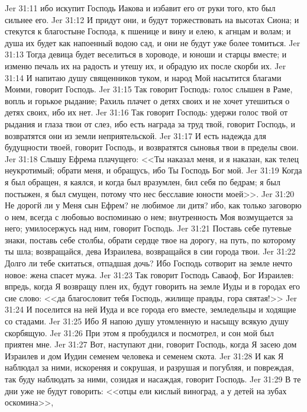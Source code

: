 \vs Jer 31:11 ибо искупит Господь Иакова и избавит его от руки того, кто был сильнее его.
\vs Jer 31:12 И придут они, и будут торжествовать на высотах Сиона; и стекутся к благостыне Господа, к пшенице и вину и елею, к агнцам и волам; и душа их будет как напоенный водою сад, и они не будут уже более томиться.
\vs Jer 31:13 Тогда девица будет веселиться в хороводе, и юноши и старцы вместе; и изменю печаль их на радость и утешу их, и обрадую их после скорби их.
\vs Jer 31:14 И напитаю душу священников туком, и народ Мой насытится благами Моими, говорит Господь.
\rsbpar\vs Jer 31:15 Так говорит Господь: голос слышен в Раме, вопль и горькое рыдание; Рахиль плачет о детях своих и не хочет утешиться о детях своих, ибо их нет.
\vs Jer 31:16 Так говорит Господь: удержи голос твой от рыдания и глаза твои от слез, ибо есть награда за труд твой, говорит Господь, и возвратятся они из земли неприятельской.
\vs Jer 31:17 И есть надежда для будущности твоей, говорит Господь, и возвратятся сыновья твои в пределы свои.
\vs Jer 31:18 Слышу Ефрема плачущего: <<Ты наказал меня, и я наказан, как телец неукротимый; обрати меня, и обращусь, ибо Ты Господь Бог мой.
\vs Jer 31:19 Когда я был обращен, я каялся, и когда был вразумлен, бил себя по бедрам; я был постыжен, я был смущен, потому что нес бесславие юности моей>>.
\vs Jer 31:20 Не дорогй ли у Меня сын Ефрем? не любимое ли дитя? ибо, как только заговорю о нем, всегда с любовью воспоминаю о нем; внутренность Моя возмущается за него; умилосержусь над ним, говорит Господь.
\vs Jer 31:21 Поставь себе путевые знаки, поставь себе столбы, обрати сердце твое на дорогу, на путь, по которому ты шла; возвращайся, дева Израилева, возвращайся в сии города твои.
\vs Jer 31:22 Долго ли тебе скитаться, отпадшая дочь? Ибо Господь сотворит на земле нечто новое: жена спасет мужа.
\rsbpar\vs Jer 31:23 Так говорит Господь Саваоф, Бог Израилев: впредь, когда Я возвращу плен их, будут говорить на земле Иуды и в городах его сие слово: <<да благословит тебя Господь, жилище правды, гора святая!>>
\vs Jer 31:24 И поселится на ней Иуда и все города его вместе, земледельцы и ходящие со стадами.
\vs Jer 31:25 Ибо Я напою душу утомленную и насыщу всякую душу скорбящую.
\vs Jer 31:26 При этом я пробудился и посмотрел, и сон мой был приятен мне.
\vs Jer 31:27 Вот, наступают дни, говорит Господь, когда Я засею дом Израилев и дом Иудин семенем человека и семенем скота.
\vs Jer 31:28 И как Я наблюдал за ними, искореняя и сокрушая, и разрушая и погубляя, и повреждая, так буду наблюдать за ними, созидая и насаждая, говорит Господь.
\vs Jer 31:29 В те дни уже не будут говорить: <<отцы ели кислый виноград, а у детей на зубах оскомина>>,
